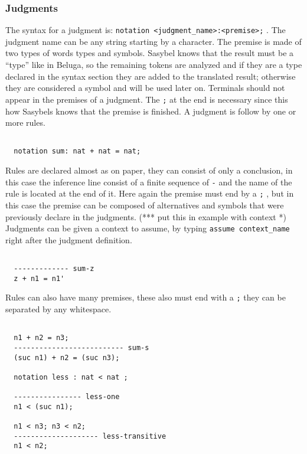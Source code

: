 \documentclass[12pt]{article}
\begin{document}
\subsubsection{Judgments}
The syntax for a judgment is: {\tt notation <judgment\_name>:<premise>;} . The judgment name can be any string starting by a character. The premise is made of two types of words types and symbols. \textmd{Sasybel} 
knows that the result must be a ``type'' like in \textmd{Beluga}, so the remaining tokens are analyzed and if they are a type declared in the syntax section 
they are added to the translated result; otherwise they are considered a symbol and will be used later on. Terminals should not appear in the premises of a judgment. The {\tt ;} at the end is necessary since this how Sasybels 
knows that the premise is finished. A judgment is follow by one or more rules.
\begin{verbatim}

  notation sum: nat + nat = nat;

\end{verbatim}
Rules are declared almost as on paper, they can consist of only a conclusion, in this case the inference line consist of a finite sequence of {\tt -} and the name of the rule is located at the end of it. Here again the premise 
must end by a {\tt ;} , but in this case the premise can be composed of alternatives and symbols that were previously declare in the judgments.
(*** put this in example with context *) Judgments can be given a context to assume, by typing {\tt assume context\_name} right after the judgment definition.
\begin{verbatim}
 
  ------------- sum-z
  z + n1 = n1'

\end{verbatim}
Rules can also have many premises, these also must end with a {\tt ;} they can be separated by any whitespace.
\begin{verbatim}

  n1 + n2 = n3;
  -------------------------- sum-s
  (suc n1) + n2 = (suc n3);

  notation less : nat < nat ;

  ---------------- less-one
  n1 < (suc n1);

  n1 < n3; n3 < n2;
  -------------------- less-transitive
  n1 < n2;

\end{verbatim}
\end{document}
